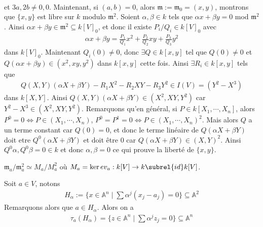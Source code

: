 \begin{expl}
\begin{align*}
                \end{align*}
                et $3a, 2b \neq 0,0$. Maintenant, si $(a,b) = 0$, alors $\mathfrak{m} := \mathfrak{m}_0 = (x,y)$, montrons que $\{x,y\}$ est libre sur $k$ modulo $\mathfrak{m}^2$. Soient $\alpha, \beta \in k$ tels que $\alpha x + \beta y = 0$ mod $\mathfrak{m}^2$. Ainsi $\alpha x + \beta y \in \mathfrak{m}^2 \subseteq k[V]_0$, et donc il existe $P_i/Q_i \in k[V]_0$ avec 
                \begin{align*}
                    \alpha x + \beta y = \frac{P_1}{Q_1}x^2 + \frac{P_2}{Q_2}xy + \frac{P_3}{Q_3}y^2
                \end{align*}
                dans $k[V]_0$. Maintenant $Q_i(0) \ne 0$, donc $\exists Q \in k[x,y]$ tel que $Q(0) \neq 0$ et $Q(\alpha x + \beta y) \in (x^2, xy, y^2)$ dans $k[x,y]$ cette fois. Ainsi $\exists R_i \in k[x,y]$ tels que 
                \begin{align*}
                    Q(X,Y)(\alpha X + \beta Y) - R_1X^2 - R_2XY - R_3Y^2 \in I(V) = (Y^2 - X^3)
                \end{align*}
                dans $k[X,Y]$. Ainsi $Q(X,Y)(\alpha X + \beta Y) \in (X^2, XY, Y^2)$ car $Y^2 - X^3 \in (X^2, XY, Y^2)$. Remarquons qu'en général, si $P \in k[X_1, \cdots, X_n]$, alors $P^0 = 0 \iff P \in (X_1, \cdots, X_n)$, $P^0 = P^1 = 0 \iff P \in (X_1, \cdots, X_n)^2$. Mais alors $Q$ a un terme constant car $Q(0) = 0$, et donc le terme linéaire de $Q(\alpha X + \beta Y)$ doit etre $Q^0(\alpha X + \beta Y)$ et doit être $0$ car $Q(\alpha X + \beta Y) \in (X,Y)^2$. Ainsi $Q^0\alpha, Q^0 \beta = 0 \in k$ et donc $\alpha, \beta = 0$ ce qui prouve la liberté de $\{x,y\}$.
            \end{expl}
            \begin{remq}
                $\mathfrak{m}_a/\mathfrak{m}_a^2 \simeq M_a/M_a^2$ où $M_a = \ker ev_a : k[V] \to k \subrel{id} k[V]$.
            \end{remq}
            Soit $a \in V$, notons
            \begin{align*}
                H_\alpha := \{x \in \mathbb{A}^n \mid \sum \alpha^j (x_j - a_j) = 0\} \subseteq \mathbb{A}^2
            \end{align*}
            Remarquons alors que $a \in H_\alpha$. Alors on a
            \begin{align*}
                \tau_a(H_\alpha) = \{z \in \mathbb{A}^n \mid \sum \alpha^jz_j = 0\} \subseteq \mathbb{A}^n
            \end{align*}
